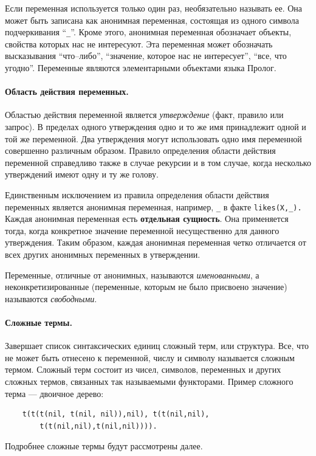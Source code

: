 \documentclass[12pt, openany, twoside]{book} %
\begin{document}
Если переменная используется только один раз, необязательно называть ее. Она может быть записана как анонимная переменная, состоящая из одного символа подчеркивания ``{\tt \_}''. Кроме этого, анонимная переменная обозначает объекты, свойства которых нас не интересуют. Эта переменная может обозначать высказывания ``что--либо'', ``значение, которое нас не интересует'', ``все, что угодно''. Переменные являются элементарными объектами языка Пролог.

\paragraph{Область действия переменных.} Областью\linebreak{} действия переменной является \emph{утверждение} (факт, правило или запрос). В пределах одного утверждения одно и то же имя принадлежит одной и той же переменной. Два утверждения могут использовать одно имя переменной совершенно различным образом. Правило определения области действия переменной справедливо также в случае рекурсии и в том случае, когда несколько утверждений имеют одну и ту же голову.

Единственным исключением из правила определения области действия переменных является анонимная переменная, например, {\tt \_} в факте {\tt likes(Х,\_).} Каждая анонимная переменная есть {\bf отдельная сущность}. Она применяется тогда, когда конкретное значение переменной несущественно для данного утверждения. Таким образом, каждая анонимная переменная четко отличается от всех других анонимных переменных в утверждении.

Переменные, отличные от анонимных, называются {\em именованными}, а неконкретизированные (переменные, которым не было присвоено значение) называются {\em свободными}.

\paragraph{Сложные термы.} Завершает список синтаксических единиц сложный терм, или структура. Все, что не может быть отнесено к переменной, числу и символу называется сложным термом. Сложный терм состоит из чисел, символов, переменных и других сложных термов, связанных так называемыми функторами. Пример сложного терма --- двоичное дерево:
{\tt\begin{verbatim}
    t(t(t(nil, t(nil, nil)),nil), t(t(nil,nil),
        t(t(nil,nil),t(nil,nil)))).
\end{verbatim}}
\noindent Подробнее сложные термы будут рассмотрены далее.
\end{document}
